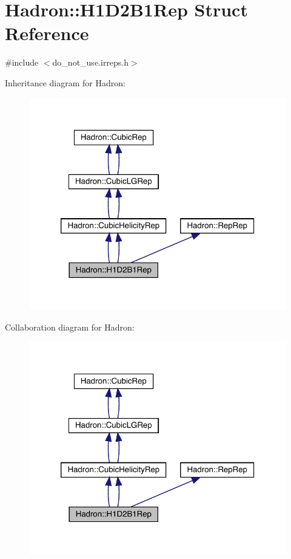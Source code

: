 \hypertarget{structHadron_1_1H1D2B1Rep}{}\section{Hadron\+:\+:H1\+D2\+B1\+Rep Struct Reference}
\label{structHadron_1_1H1D2B1Rep}


{\ttfamily \#include $<$do\+\_\+not\+\_\+use.\+irreps.\+h$>$}



Inheritance diagram for Hadron\+:\nopagebreak
\begin{figure}[H]
\begin{center}
\leavevmode
\includegraphics[width=320pt]{db/dc9/structHadron_1_1H1D2B1Rep__inherit__graph}
\end{center}
\end{figure}


Collaboration diagram for Hadron\+:\nopagebreak
\begin{figure}[H]
\begin{center}
\leavevmode
\includegraphics[width=320pt]{de/d57/structHadron_1_1H1D2B1Rep__coll__graph}
\end{center}
\end{figure}
